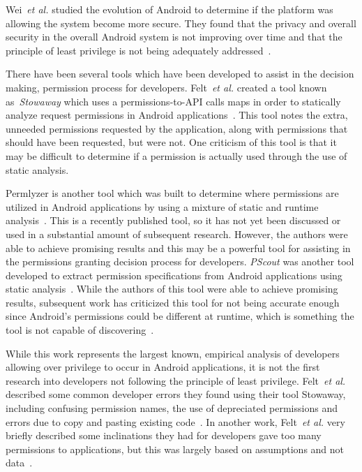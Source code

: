 \documentclass{sig-alternate}
\begin{document}
Wei~\emph{et al.} studied the evolution of Android to determine if the platform was allowing the system become more secure. They found that the privacy and overall security in the overall Android system is not improving over time and that the principle of least privilege is not being adequately addressed~\cite{Wei:2012:PEA:2420950.2420956}. %



There have been several tools which have been developed to assist in the decision making, permission process for developers. Felt~\emph{et al.} created a tool known as~\emph{Stowaway} which uses a permissions-to-API calls maps in order to statically analyze request permissions in Android applications~\cite{Felt:2011:APD:2046707.2046779}. This tool notes the extra, unneeded permissions requested by the application, along with permissions that should have been requested, but were not. One criticism of this tool is that it may be difficult to determine if a permission is actually used through the use of static analysis. 

Permlyzer is another tool which was built to determine where permissions are utilized in Android applications by using a mixture of static and runtime analysis~\cite{6698893}. This is a recently published tool, so it has not yet been discussed or used in a substantial amount of subsequent research. However, the authors were able to achieve promising results and this may be a powerful tool for assisting in the permissions granting decision process for developers. \emph{PScout} was another tool developed to extract permission specifications from Android applications using static analysis~\cite{Au:2012:PAA:2382196.2382222}. While the authors of this tool were able to achieve promising results, subsequent work has criticized this tool for not being accurate enough since Android's permissions could be different at runtime, which is something the tool is not capable of discovering~\cite{zhang2013vetting}.

While this work represents the largest known, empirical analysis of developers allowing over privilege to occur in Android applications, it is not the first research into developers not following the principle of least privilege. Felt~\emph{et al.} described some common developer errors they found using their tool Stowaway, including confusing permission names, the use of depreciated permissions and errors due to copy and pasting existing code~\cite{Felt:2011:APD:2046707.2046779}. In another work,  Felt~\emph{et al.} very briefly described some inclinations they had for developers gave too many permissions to applications, but this was largely based on assumptions and not data~\cite{Felt:2011:EAP:2002168.2002175}.
\end{document}
